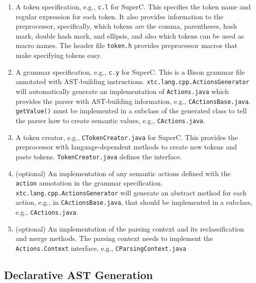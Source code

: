 \documentclass{article}
\newcommand{\SuperC}{{\textsf{Su\-perC}}}
\begin{document}
\begin{enumerate}
\item A token specification, e.g., \verb"c.l" for \SuperC{}.  This
  specifies the token name and regular expression for each token.  It
  also provides information to the preprocessor, specifically, which
  tokens are the comma, parentheses, hash mark, double hash mark, and
  ellipsis, and also which tokens can be used as macro names.  The
  header file \verb"token.h" provides preprocessor macros that make
  specifying tokens easy.
\item A grammar specification, e.g., \verb"c.y" for \SuperC{}.  This
  is a Bison grammar file annotated with AST-building instructions.
  \verb"xtc.lang.cpp.ActionsGenerator" will automatically generate an
  implementation of \verb"Actions.java" which provides the parser with
  AST-building information, e.g., \verb"CActionsBase.java".
  \verb"getValue()" must be implemented in a subclass of the generated
  class to tell the parser how to create semantic values, e.g.,
  \verb"CActions.java".
\item A token creator, e.g., \verb"CTokenCreator.java" for \SuperC{}.
  This provides the preprocessor with language-dependent methods to
  create new tokens and paste tokens.  \verb"TokenCreator.java"
  defines the interface.
\item (optional) An implementation of any semantic actions defined
  with the \verb"action" annotation in the grammar specification.
  \verb"xtc.lang.cpp.ActionsGenerator" will generate an abstract
  method for each action, e.g., in \verb"CActionsBase.java", that
  should be implemented in a subclass, e.g., \verb"CActions.java".
\item (optional) An implementation of the parsing context and its
  reclassification and merge methods.  The parsing context needs to
  implement the \verb"Actions.Context" interface, e.g.,
  \verb"CParsingContext.java"
\end{enumerate}

\subsection{Declarative AST Generation}
\end{document}
